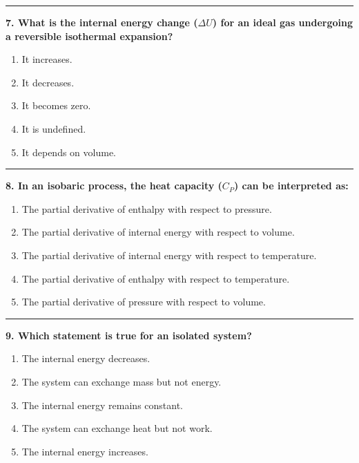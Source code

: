\documentclass[
  9pt,
]{extbook}
\providecommand{\tightlist}{%
  \setlength{\itemsep}{0pt}\setlength{\parskip}{0pt}}
\theoremstyle{definition}
\theoremstyle{definition}
\theoremstyle{definition}
\theoremstyle{remark}
\begin{document}
\begin{center}\rule{0.5\linewidth}{0.5pt}\end{center}

\textbf{7. What is the internal energy change (\(\Delta U\)) for an ideal gas undergoing a reversible isothermal expansion?}

\begin{enumerate}
\def\labelenumi{\alph{enumi}.}
\tightlist
\item
  It increases.
\item
  It decreases.
\item
  It becomes zero.
\item
  It is undefined.
\item
  It depends on volume.
\end{enumerate}

\begin{center}\rule{0.5\linewidth}{0.5pt}\end{center}

\textbf{8. In an isobaric process, the heat capacity (\(C_P\)) can be interpreted as:}

\begin{enumerate}
\def\labelenumi{\alph{enumi}.}
\tightlist
\item
  The partial derivative of enthalpy with respect to pressure.
\item
  The partial derivative of internal energy with respect to volume.
\item
  The partial derivative of internal energy with respect to temperature.
\item
  The partial derivative of enthalpy with respect to temperature.
\item
  The partial derivative of pressure with respect to volume.
\end{enumerate}

\begin{center}\rule{0.5\linewidth}{0.5pt}\end{center}

\textbf{9. Which statement is true for an isolated system?}

\begin{enumerate}
\def\labelenumi{\alph{enumi}.}
\tightlist
\item
  The internal energy decreases.
\item
  The system can exchange mass but not energy.
\item
  The internal energy remains constant.
\item
  The system can exchange heat but not work.
\item
  The internal energy increases.
\end{enumerate}
\end{document}
